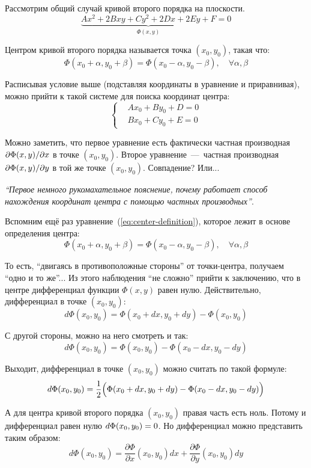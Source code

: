 \documentclass[a4paper,12pt]{article}
\begin{document}
  Рассмотрим общий случай кривой второго порядка на плоскости.
  \[
    \underbrace{Ax^2 + 2Bxy + Cy^2 + 2Dx + 2Ey + F}_{\Phi(x, y)} = 0
  \]
  
  Центром кривой второго порядка называется точка $(x_0, y_0)$, такая что:
  \begin{equation}\label{eq:center-definition}
    \Phi(x_0 + \alpha, y_0 + \beta) = \Phi(x_0 - \alpha, y_0 - \beta),\quad \forall \alpha, \beta
  \end{equation}
  
  Расписывая условие выше (подставляя координаты в уравнение и приравнивая), можно прийти к такой системе для поиска координат центра:
  \[
    \left\{
      \begin{aligned}
        &Ax_0 + By_0 + D = 0\\
        &Bx_0 + Cy_0 + E = 0
      \end{aligned}
    \right.
  \]
  
  Можно заметить, что первое уравнение есть фактически частная производная $\partial \Phi(x, y) \hm/ \partial x$ в точке $(x_0, y_0)$.
  Второе уравнение~---~частная производная $\partial \Phi(x, y) \hm/ \partial y$ в той же точке $(x_0, y_0)$.
  Совпадение?
  Или...
  
  
  \medskip
  \emph{``Первое немного рукомахательное пояснение, почему работает способ нахождения координат центра с помощью частных производных''}.
  
  Вспомним ещё раз уравнение~(\ref{eq:center-definition}), которое лежит в основе определения центра:
  \[
    \Phi(x_0 + \alpha, y_0 + \beta) = \Phi(x_0 - \alpha, y_0 - \beta),\quad \forall \alpha, \beta
  \]
  
  То есть, ``двигаясь в противоположные стороны'' от точки-центра, получаем ``одно и то же''...
  Из этого наблюдения ``не сложно'' прийти к заключению, что в центре дифференциал функции $\Phi(x, y)$ равен нулю.
  Действительно, дифференциал в точке $(x_0, y_0)$:
  \[
    d\Phi(x_0, y_0) = \Phi(x_0 + dx, y_0 + dy) - \Phi(x_0, y_0)
  \]
  
  С другой стороны, можно на него смотреть и так:
  \[
    d\Phi(x_0, y_0) = \Phi(x_0, y_0) - \Phi(x_0 - dx, y_0 - dy)
  \]
  
  Выходит, дифференциал в точке $(x_0, y_0)$ можно считать по такой формуле:
  \[
    d\Phi(x_0, y_0) = \frac{1}{2} \Bigl(\Phi(x_0 + dx, y_0 + dy) - \Phi(x_0 - dx, y_0 - dy)\Bigr)
  \]
  
  А для центра кривой второго порядка $(x_0, y_0)$ правая часть есть ноль.
  Потому и дифференциал равен нулю $d\Phi(x_0, y_0) \hm= 0$.
  Но дифференциал можно представить таким образом:
  \[
    d\Phi(x_0, y_0) = \frac{\partial \Phi}{\partial x}(x_0, y_0) dx + \frac{\partial \Phi}{\partial y}(x_0, y_0) dy
  \]
  
\end{document}
